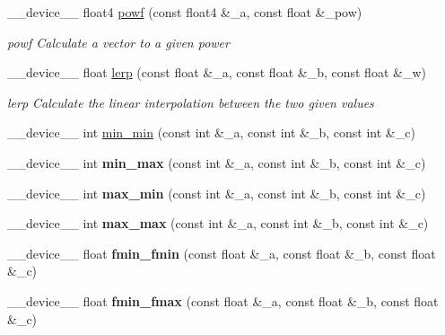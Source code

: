 \begin{DoxyCompactItemize}
\-\_\-\-\_\-device\-\_\-\-\_\- float4 \hyperlink{MathHelpers_8cuh_a6d88746ea92fc75d76dbabf90bf189f9}{powf} (const float4 \&\-\_\-a, const float \&\-\_\-pow)
\begin{DoxyCompactList}\small\item\em powf Calculate a vector to a given power \end{DoxyCompactList}\item 
\-\_\-\-\_\-device\-\_\-\-\_\- float \hyperlink{MathHelpers_8cuh_a58869102c1eb50c1e1476fcee48a240b}{lerp} (const float \&\-\_\-a, const float \&\-\_\-b, const float \&\-\_\-w)
\begin{DoxyCompactList}\small\item\em lerp Calculate the linear interpolation between the two given values \end{DoxyCompactList}\item 
\-\_\-\-\_\-device\-\_\-\-\_\- int \hyperlink{MathHelpers_8cuh_a78cf7ac0b1a34e13feb284871f698604}{min\-\_\-min} (const int \&\-\_\-a, const int \&\-\_\-b, const int \&\-\_\-c)
\item 
\hypertarget{MathHelpers_8cuh_ae5945e834beb12796bbd16cefdda33d1}{\-\_\-\-\_\-device\-\_\-\-\_\- int {\bfseries min\-\_\-max} (const int \&\-\_\-a, const int \&\-\_\-b, const int \&\-\_\-c)}\label{MathHelpers_8cuh_ae5945e834beb12796bbd16cefdda33d1}

\item 
\hypertarget{MathHelpers_8cuh_a3f474b285d9ba547ee45c40231bb227e}{\-\_\-\-\_\-device\-\_\-\-\_\- int {\bfseries max\-\_\-min} (const int \&\-\_\-a, const int \&\-\_\-b, const int \&\-\_\-c)}\label{MathHelpers_8cuh_a3f474b285d9ba547ee45c40231bb227e}

\item 
\hypertarget{MathHelpers_8cuh_a6be66ab1dc348834263e5160a8e6dbae}{\-\_\-\-\_\-device\-\_\-\-\_\- int {\bfseries max\-\_\-max} (const int \&\-\_\-a, const int \&\-\_\-b, const int \&\-\_\-c)}\label{MathHelpers_8cuh_a6be66ab1dc348834263e5160a8e6dbae}

\item 
\hypertarget{MathHelpers_8cuh_ab0973c241c8ffcf6990be1d15b504b06}{\-\_\-\-\_\-device\-\_\-\-\_\- float {\bfseries fmin\-\_\-fmin} (const float \&\-\_\-a, const float \&\-\_\-b, const float \&\-\_\-c)}\label{MathHelpers_8cuh_ab0973c241c8ffcf6990be1d15b504b06}

\item 
\hypertarget{MathHelpers_8cuh_a803e7bc317092b4a518c01665c42bd16}{\-\_\-\-\_\-device\-\_\-\-\_\- float {\bfseries fmin\-\_\-fmax} (const float \&\-\_\-a, const float \&\-\_\-b, const float \&\-\_\-c)}\label{MathHelpers_8cuh_a803e7bc317092b4a518c01665c42bd16}


\end{DoxyCompactItemize}
